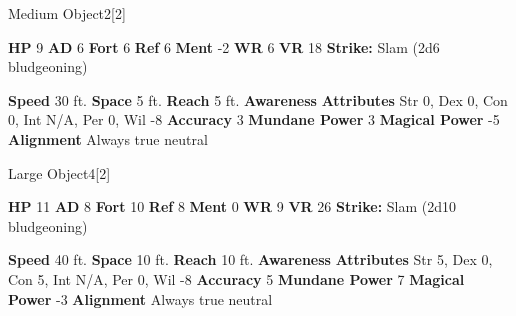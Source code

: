   

  \begin{monsubsection}{Medium Object}{2}[2]
    \vspace{-1em}\vspace{-1em}
    \vspace{0em}

    
    

    \begin{spellcontent}
      \begin{spelltargetinginfo}
        \pari \textbf{HP} 9 \monsep
          \textbf{AD} 6 \monsep
          \textbf{Fort} 6 \monsep
          \textbf{Ref} 6 \monsep
          \textbf{Ment} -2
        \pari \textbf{WR} 6 \monsep
        \textbf{VR} 18
        \pari \textbf{Strike:}
            Slam  (2d6 bludgeoning)
      \end{spelltargetinginfo}
    \end{spellcontent}
    \begin{monsterfooter}
      \pari \textbf{Speed} 30 ft. \monsep
        \textbf{Space} 5 ft. \monsep
        \textbf{Reach} 5 ft.
      \pari \textbf{Awareness} 
      \pari \textbf{Attributes}
        Str 0, Dex 0,
        Con 0, Int N/A,
        Per 0, Wil -8
      \pari \textbf{Accuracy} 3 \monsep
        \textbf{Mundane Power} 3 \monsep
      \textbf{Magical Power} -5
      \pari \textbf{Alignment} Always true neutral
    \end{monsterfooter}
  \end{monsubsection}
  
  

  \begin{monsubsection}{Large Object}{4}[2]
    \vspace{-1em}\vspace{-1em}
    \vspace{0em}

    
    

    \begin{spellcontent}
      \begin{spelltargetinginfo}
        \pari \textbf{HP} 11 \monsep
          \textbf{AD} 8 \monsep
          \textbf{Fort} 10 \monsep
          \textbf{Ref} 8 \monsep
          \textbf{Ment} 0
        \pari \textbf{WR} 9 \monsep
        \textbf{VR} 26
        \pari \textbf{Strike:}
            Slam  (2d10 bludgeoning)
      \end{spelltargetinginfo}
    \end{spellcontent}
    \begin{monsterfooter}
      \pari \textbf{Speed} 40 ft. \monsep
        \textbf{Space} 10 ft. \monsep
        \textbf{Reach} 10 ft.
      \pari \textbf{Awareness} 
      \pari \textbf{Attributes}
        Str 5, Dex 0,
        Con 5, Int N/A,
        Per 0, Wil -8
      \pari \textbf{Accuracy} 5 \monsep
        \textbf{Mundane Power} 7 \monsep
      \textbf{Magical Power} -3
      \pari \textbf{Alignment} Always true neutral
    \end{monsterfooter}
  \end{monsubsection}
  
